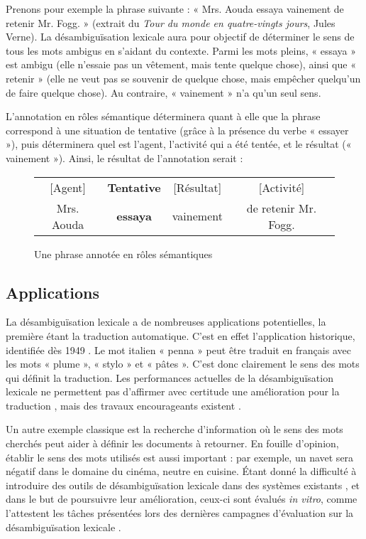 Prenons pour exemple la phrase suivante : « Mrs. Aouda essaya vainement de retenir Mr. Fogg. » (extrait du \textit{Tour du monde en quatre-vingts jours}, Jules Verne). La désambiguïsation lexicale aura pour objectif de déterminer le sens de tous les mots ambigus en s'aidant du contexte. Parmi les mots pleins, « essaya » est ambigu (elle n'essaie pas un vêtement, mais tente quelque chose), ainsi que « retenir » (elle ne veut pas se souvenir de quelque chose, mais empêcher quelqu'un de faire quelque chose). Au contraire, « vainement » n'a qu'un seul sens.

L'annotation en rôles sémantique déterminera quant à elle que la phrase correspond à une situation de tentative (grâce à la présence du verbe « essayer »), puis déterminera quel est l'agent, l'activité qui a été tentée, et le résultat (« vainement »). Ainsi, le résultat de l'annotation serait :

\begin{figure}[htbl]
    \centering
    \begin{tabular}{cccc}
      [Agent]  & \textbf{Tentative} & [Résultat]  & [Activité]           \tabularnewline
    Mrs. Aouda & \textbf{essaya}  & vainement  & de retenir Mr. Fogg. \tabularnewline
    \end{tabular}
    \caption{Une phrase annotée en rôles sémantiques}
\end{figure}

\subsection{Applications}

La désambiguïsation lexicale a de nombreuses applications potentielles, la
première étant la traduction automatique. C'est en effet l'application
historique, identifiée dès 1949 \citep{weaver1949translation}. Le mot italien «
penna » peut être traduit en français avec les mots « plume », « stylo » et «
pâtes ». C'est donc clairement le sens des mots qui définit la traduction. Les
performances actuelles de la désambiguïsation lexicale ne permettent pas
d'affirmer avec certitude une amélioration pour la traduction
\citep{apidianaki2009place}, mais des travaux encourageants existent
\citep{chan2007word}.

Un autre exemple classique est la recherche d'information où le sens des mots
cherchés peut aider à définir les documents à retourner. En fouille d'opinion,
établir le sens des mots utilisés est aussi important : par exemple, un navet
sera négatif dans le domaine du cinéma, neutre en cuisine. Étant donné la
difficulté à introduire des outils de désambiguïsation lexicale dans des
systèmes existants \citep{navigli2009word}, et dans le but de poursuivre leur
amélioration, ceux-ci sont évalués \textit{in vitro}, comme l'attestent les
tâches présentées lors des dernières campagnes d'évaluation sur la
désambiguïsation lexicale
\citep{agirre2010semeval,manandhar2010semeval,lefever2010semeval}.

